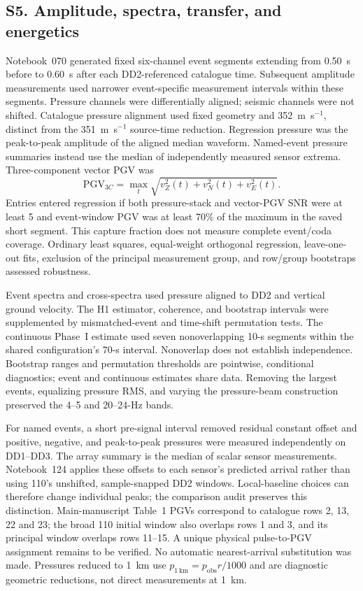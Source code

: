 \documentclass[]{seismica}
\begin{document}
\FloatBarrier
\subsection{S5. Amplitude, spectra, transfer, and energetics}
\label{sec:supp_energy}

Notebook~070 generated fixed six-channel event segments extending from 0.50~s
before to 0.60~s after each DD2-referenced catalogue time. Subsequent amplitude
measurements used narrower event-specific measurement intervals within these
segments. Pressure channels were differentially aligned; seismic
channels were not shifted. Catalogue pressure alignment used fixed geometry
and 352~m~s$^{-1}$, distinct from the 351~m~s$^{-1}$ source-time reduction.
Regression pressure was the peak-to-peak amplitude
of the aligned median waveform. Named-event pressure summaries instead use
the median of independently measured sensor extrema.
Three-component vector PGV was
\begin{equation}
 \mathrm{PGV}_{3C}=\max_t\sqrt{v_Z^2(t)+v_N^2(t)+v_E^2(t)}.
\end{equation}
Entries entered regression if both pressure-stack and vector-PGV SNR were at
least 5 and event-window PGV was at least 70\% of the maximum in the saved
short segment. This capture fraction does not measure complete event/coda
coverage. Ordinary least squares,
equal-weight orthogonal regression, leave-one-out fits, exclusion of the
principal measurement group, and row/group bootstraps assessed robustness.

Event spectra and cross-spectra used pressure aligned to DD2 and vertical
ground velocity. The H1 estimator, coherence, and bootstrap intervals were
supplemented by mismatched-event and time-shift permutation tests. The
continuous Phase~I estimate used seven nonoverlapping 10-s segments within
the shared configuration's 70-s interval. Nonoverlap does not establish
independence. Bootstrap ranges and permutation thresholds are pointwise,
conditional diagnostics; event and continuous estimates share data. Removing the
largest events, equalizing pressure RMS, and varying the pressure-beam
construction preserved the 4--5 and 20--24-Hz bands.

For named events, a short pre-signal interval removed residual constant offset
and positive, negative, and peak-to-peak pressures were measured independently
on DD1--DD3. The array summary is the median of scalar sensor measurements.
Notebook~124 applies these offsets to each sensor's predicted arrival rather
than using 110's unshifted, sample-snapped DD2 windows. Local-baseline choices
can therefore change individual peaks; the comparison audit preserves this
distinction. Main-manuscript Table~1 PGVs correspond to catalogue rows 2, 13, 22 and 23;
the broad 110 initial window also overlaps rows 1 and 3, and its principal
window overlaps rows 11--15. A unique physical pulse-to-PGV assignment remains
to be verified. No automatic nearest-arrival substitution was made.
Pressures reduced to 1~km use $p_{1\,\mathrm{km}}=p_{\mathrm{obs}}r/1000$ and
are diagnostic geometric reductions, not direct measurements at 1~km.
\end{document}
